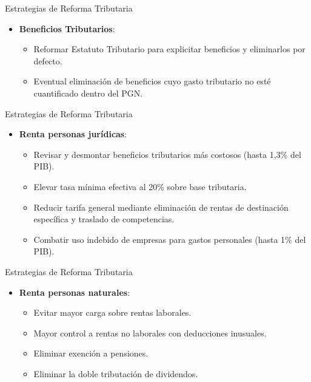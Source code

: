 \begin{frame}{Estrategias de Reforma Tributaria}
\begin{itemize}
    \item \textbf{Beneficios Tributarios}:
    \begin{itemize}
        \item Reformar Estatuto Tributario para explicitar beneficios y eliminarlos por defecto.
        \item Eventual eliminación de beneficios cuyo gasto tributario no esté cuantificado dentro del PGN.
    \end{itemize}
\end{itemize}
\end{frame}

\begin{frame}{Estrategias de Reforma Tributaria}
\begin{itemize}
    \item \textbf{Renta personas jurídicas}:
    \begin{itemize}
        \item Revisar y desmontar beneficios tributarios más costosos (hasta 1,3\% del PIB).
        \item Elevar tasa mínima efectiva al 20\% sobre base tributaria.
        \item Reducir tarifa general mediante eliminación de rentas de destinación específica y traslado de competencias.
        \item Combatir uso indebido de empresas para gastos personales (hasta 1\% del PIB).
    \end{itemize}
\end{itemize}
\end{frame}

\begin{frame}{Estrategias de Reforma Tributaria}
\begin{itemize}    
    \item \textbf{Renta personas naturales}:
    \begin{itemize}
        \item Evitar mayor carga sobre rentas laborales.
        \item Mayor control a rentas no laborales con deducciones inusuales.
        \item Eliminar exención a pensiones.
        \item Eliminar la doble tributación de dividendos.
    \end{itemize}
\end{itemize}
\end{frame}


